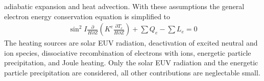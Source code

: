 adiabatic expansion and heat advection.  With
these assumptions the general electron energy conservation equation
is simplified to
%
\begin{align}
   \sin^2 I \frac{\partial}{H \partial Z}\left( K^e \frac{\partial T_e}{H \partial Z}\right)
    + \sum Q_e - \sum L_e = 0
\end{align}
%
The heating sources are solar EUV radiation, deactivation of excited
neutral and ion species, dissociative recombination of electrons
with ions, energetic particle precipitation, and Joule heating. Only
the solar EUV radiation and the energetic particle precipitation are
considered, all other contributions are neglectable small. \\

